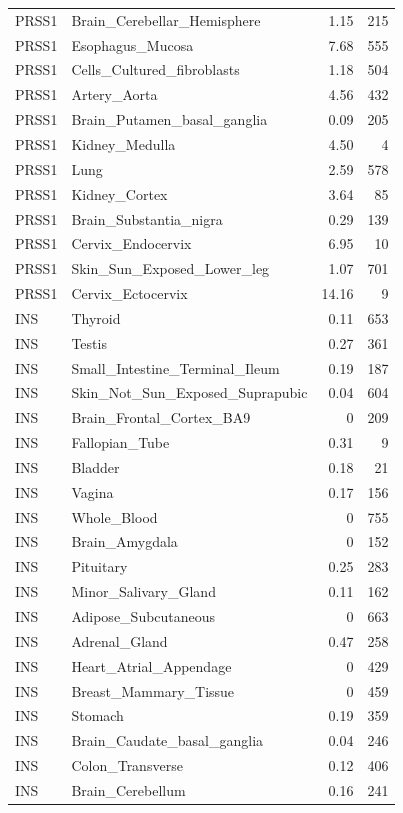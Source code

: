\begin{footnotesize}
\begin{longtable}{llrr}
PRSS1 & Brain\_Cerebellar\_Hemisphere & 1.15 & 215 \\
PRSS1 & Esophagus\_Mucosa & 7.68 & 555 \\
PRSS1 & Cells\_Cultured\_fibroblasts & 1.18 & 504 \\
PRSS1 & Artery\_Aorta & 4.56 & 432 \\
PRSS1 & Brain\_Putamen\_basal\_ganglia & 0.09 & 205 \\
PRSS1 & Kidney\_Medulla & 4.50 & 4 \\
PRSS1 & Lung & 2.59 & 578 \\
PRSS1 & Kidney\_Cortex & 3.64 & 85 \\
PRSS1 & Brain\_Substantia\_nigra & 0.29 & 139 \\
PRSS1 & Cervix\_Endocervix & 6.95 & 10 \\
PRSS1 & Skin\_Sun\_Exposed\_Lower\_leg & 1.07 & 701 \\
PRSS1 & Cervix\_Ectocervix & 14.16 & 9 \\
INS & Thyroid & 0.11 & 653 \\
INS & Testis & 0.27 & 361 \\
INS & Small\_Intestine\_Terminal\_Ileum & 0.19 & 187 \\
INS & Skin\_Not\_Sun\_Exposed\_Suprapubic & 0.04 & 604 \\
INS & Brain\_Frontal\_Cortex\_BA9 & 0 & 209 \\
INS & Fallopian\_Tube & 0.31 & 9 \\
INS & Bladder & 0.18 & 21 \\
INS & Vagina & 0.17 & 156 \\
INS & Whole\_Blood & 0 & 755 \\
INS & Brain\_Amygdala & 0 & 152 \\
INS & Pituitary & 0.25 & 283 \\
INS & Minor\_Salivary\_Gland & 0.11 & 162 \\
INS & Adipose\_Subcutaneous & 0 & 663 \\
INS & Adrenal\_Gland & 0.47 & 258 \\
INS & Heart\_Atrial\_Appendage & 0 & 429 \\
INS & Breast\_Mammary\_Tissue & 0 & 459 \\
INS & Stomach & 0.19 & 359 \\
INS & Brain\_Caudate\_basal\_ganglia & 0.04 & 246 \\
INS & Colon\_Transverse & 0.12 & 406 \\
INS & Brain\_Cerebellum & 0.16 & 241 \\

\end{longtable}
\end{footnotesize}
